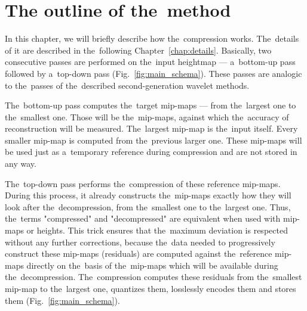 \chapter{The outline of the~method}\label{chap:outline}

\newcommand{\objnorm}[2]{\mathbold{#1_{#2}}}
\newcommand{\objdot}[2]{\mathbold{#1_{#2}^\bullet}}
\newcommand{\lnorm}[1]{\objnorm{L}{#1}}
\newcommand{\ldot}[1]{\mathbold{L_{#1}^\bullet}}

\newcommand{\opnorm}[2]{\mathit{#1_{#2}}}
\newcommand{\dnorm}{\opnorm{Q}{D}}

In this chapter, we will briefly describe how the~compression works. The~details of it are described in the~following Chapter~\ref{chap:details}. Basically, two consecutive passes are performed on the~input heightmap --- a~bottom-up pass followed by a~top-down pass (Fig.~\ref{fig:main_schema}). These passes are analogic to the~passes of the~described second-generation wavelet methods. 
	
The~bottom-up pass computes the~target mip-maps --- from the~largest one to the~smallest one. Those will be the~mip-maps, against which the~accuracy of reconstruction will be measured. The~largest mip-map is the~input itself. Every smaller mip-map is computed from the~previous larger one. These mip-maps will be used just as a~temporary reference during compression and are not stored in any way.

The~top-down pass performs the~compression of these reference mip-maps. During this process, it already constructs the~mip-maps exactly how they will look after the~decompression, from the~smallest one to the~largest one. Thus, the~terms "compressed" and "decompressed" are equivalent when used with mip-maps or heights. This trick ensures that the~maximum deviation is respected without any further corrections, because the~data needed to progressively construct these mip-maps (residuals) are computed against the~reference mip-maps directly on the~basis of the~mip-maps which will be available during the~decompression. The~compression computes these residuals from the~smallest mip-map to the~largest one, quantizes them, losslessly encodes them and stores them (Fig.~\ref{fig:main_schema}).

